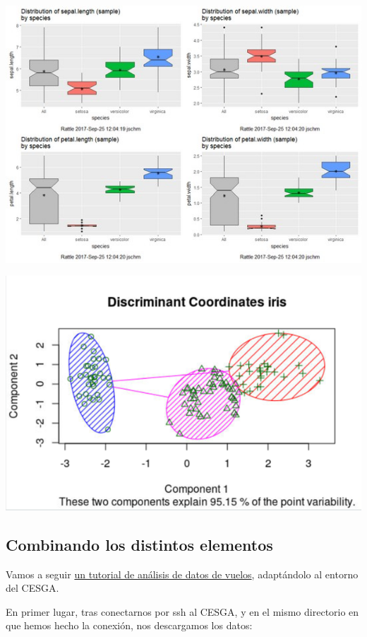 \documentclass[]{book}
\begin{document}
\includegraphics{images/T3-rattle2.png}

\includegraphics{images/T3-rattle3.png}

\hypertarget{combinando-los-distintos-elementos}{%
\subsection{Combinando los distintos elementos}\label{combinando-los-distintos-elementos}}

Vamos a seguir \href{http://hua-zhou.github.io/teaching/biostatm280-2019winter/slides/16-sparklyr/sparklyr-intro.html}{un tutorial de análisis de datos de vuelos}, adaptándolo al entorno del CESGA.

En primer lugar, tras conectarnos por ssh al CESGA, y en el mismo directorio en que hemos hecho la conexión, nos descargamos los datos:
\end{document}

